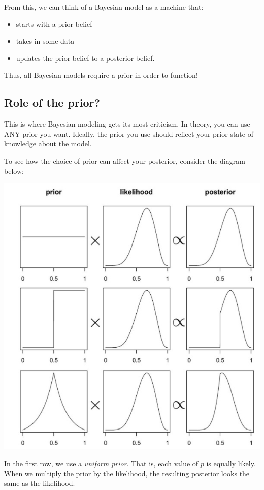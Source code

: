 \documentclass[11pt]{article}
\begin{document}
From this, we can think of a Bayesian model as a machine that:
\begin{itemize}
\item starts with a prior belief
\item takes in some data
\item updates the prior belief to a posterior belief.
\end{itemize}

Thus, all Bayesian models require a prior in order to function!  

\subsection*{Role of the prior?}
\label{sec-5-3}
This is where Bayesian modeling gets its most criticism.  In theory, you can use ANY prior you want.  Ideally, the prior you use should reflect your prior state of knowledge about the model.  

To see how the choice of prior can affect your posterior, consider the diagram below:

\includegraphics[width=.9\linewidth]{figures/week8/priors.jpg}

In the first row, we use a \emph{uniform prior}.  That is, each value of $p$ is equally likely.  When we multiply the prior by the likelihood, the resulting posterior looks the same as the likelihood.
\end{document}
